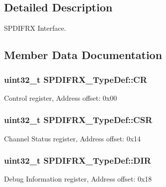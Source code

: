 \subsection{Detailed Description}
S\+P\+D\+I\+F\+RX Interface. 

\subsection{Member Data Documentation}
\subsubsection[{\texorpdfstring{CR}{CR}}]{ uint32\+\_\+t S\+P\+D\+I\+F\+R\+X\+\_\+\+Type\+Def\+::\+CR}\hypertarget{struct_s_p_d_i_f_r_x___type_def_af97c3ae3a1ced6864b75ee530d96e2d7}{}\label{struct_s_p_d_i_f_r_x___type_def_af97c3ae3a1ced6864b75ee530d96e2d7}
Control register, Address offset\+: 0x00 
\subsubsection[{\texorpdfstring{C\+SR}{CSR}}]{ uint32\+\_\+t S\+P\+D\+I\+F\+R\+X\+\_\+\+Type\+Def\+::\+C\+SR}\hypertarget{struct_s_p_d_i_f_r_x___type_def_a8d811e4f5a16f36d6cb45d1369eec51b}{}\label{struct_s_p_d_i_f_r_x___type_def_a8d811e4f5a16f36d6cb45d1369eec51b}
Channel Status register, Address offset\+: 0x14 
\subsubsection[{\texorpdfstring{D\+IR}{DIR}}]{ uint32\+\_\+t S\+P\+D\+I\+F\+R\+X\+\_\+\+Type\+Def\+::\+D\+IR}\hypertarget{struct_s_p_d_i_f_r_x___type_def_a76f50bd37d940fd507da3fec5326c96a}{}\label{struct_s_p_d_i_f_r_x___type_def_a76f50bd37d940fd507da3fec5326c96a}
Debug Information register, Address offset\+: 0x18 
